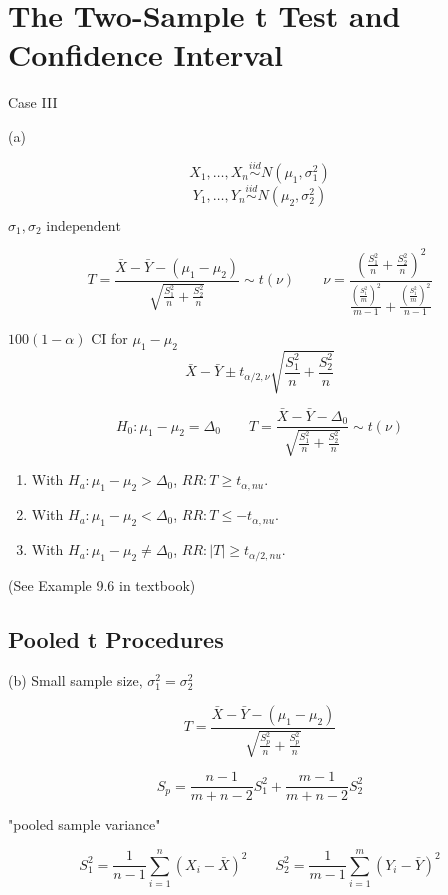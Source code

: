 \section{The Two-Sample t Test and Confidence Interval}
Case III

(a) 

\[X_1,\dots,X_n \overset{iid}{\sim} N(\mu_1,\sigma_1^2)\]
\[Y_1,\dots,Y_n \overset{iid}{\sim} N(\mu_2,\sigma_2^2)\] 

$\sigma_1,\sigma_2 \text{ independent} $

\[T=\frac{\bar{X}-\bar{Y}-(\mu_1-\mu_2)}{\sqrt{\frac{S_1^2}{n}+\frac{S_2^2}{n}}} \sim t(\nu) \qquad \nu=\frac{\left( \frac{S_1^2}{n}+\frac{S_2^2}{n} \right)^2}{ \frac{\left( \frac{S_1^2}{m} \right)^2}{m-1}+ \frac{\left( \frac{S_1^2}{m} \right)^2}{n-1}  } \]

$100(1-\alpha)$ CI for $\mu_1-\mu_2$
\[\bar{X}-\bar{Y} \pm t_{\alpha/2,\nu} \sqrt{\frac{S_1^2}{n}+\frac{S_2^2}{n}}  \]

\[H_0:\mu_1-\mu_2=\Delta_0 \qquad T=\frac{\bar{X}-\bar{Y}-\Delta_0}{\sqrt{\frac{S_1^2}{n}+\frac{S_2^2}{n}}} \sim t(\nu)\]
\begin{enumerate}
\item With $H_a: \mu_1-\mu_2>\Delta_0$, $RR:T\geq t_{\alpha,nu}$.
\item With $H_a: \mu_1-\mu_2<\Delta_0$, $RR:T\leq -t_{\alpha,nu}$.
\item With $H_a: \mu_1-\mu_2\neq\Delta_0$, $RR:|T|\geq t_{\alpha/2,nu}$.
\end{enumerate}

\begin{exmp}
(See Example 9.6 in textbook)
\end{exmp}

\subsection{Pooled t Procedures}
(b) Small sample size, $\sigma_1^2=\sigma_2^2$

\[T=\frac{\bar{X}-\bar{Y}-(\mu_1-\mu_2)}{\sqrt{\frac{S_p^2}{n}+\frac{S_p^2}{n}}}\]

\[S_p=\frac{n-1}{m+n-2}S_1^2+\frac{m-1}{m+n-2}S_2^2\]

"pooled sample variance"

\[S_1^2=\frac{1}{n-1} \sum_{i=1}^n (X_i-\bar{X})^2 \qquad S_2^2=\frac{1}{m-1} \sum_{i=1}^m (Y_i-\bar{Y})^2 \]

